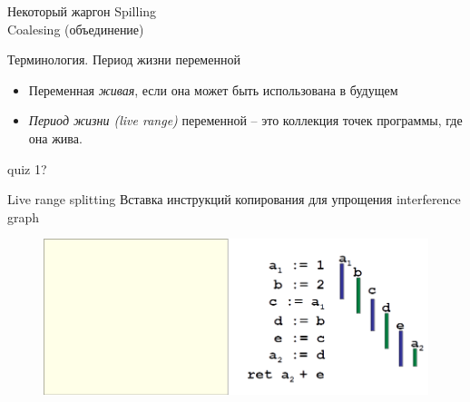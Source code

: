 \documentclass[aspectratio=169
  , xcolor={svgnames}
  , hyperref={ colorlinks,citecolor=DeepPink4
             , linkcolor=DarkRed,urlcolor=DarkBlue}
  , russian
  ]{beamer}
\theoremstyle{exerciseStyle1}
\begin{document}
\begin{frame}{Некоторый жаргон}
Spilling\\

Coalesing (объединение)
\end{frame}



\begin{frame}{Терминология. Период жизни переменной}
\begin{minipage}{.48\textwidth}
\begin{itemize}
\item Переменная \emph{живая}, если она может быть использована в будущем
\item \emph{Период жизни (live range)} переменной -- это коллекция точек программы, где она жива.
\end{itemize}
\end{minipage}

\end{frame}

\begin{frame}[fragile]{}
quiz 1?
\end{frame}



\begin{frame}[fragile]{Live range splitting}
%  
Вставка инструкций копирования для упрощения interference graph
\begin{minipage}[t]{0.48\textwidth}
  
\end{minipage}
\begin{minipage}[t]{0.4\textwidth}
  
\end{minipage}
\end{frame}

\begin{frame}[fragile]{}
\begin{figure}
\centering
\includegraphics[width=0.9\paperwidth]{figures/quiz2}
\end{figure}

\end{frame}
\end{document}
